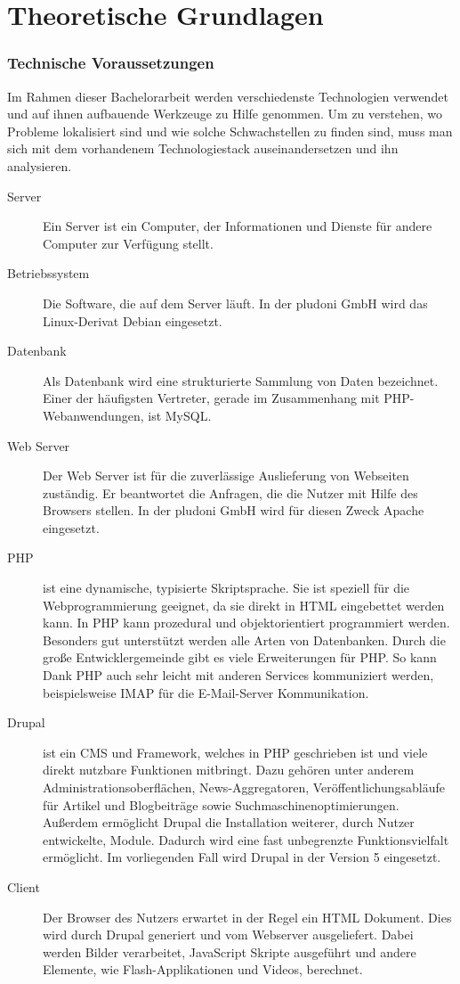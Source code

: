 \part{Theoretische Grundlagen}
\label{sec:theory}

\section{Technische Voraussetzungen}
Im Rahmen dieser Bachelorarbeit werden verschiedenste Technologien verwendet und auf ihnen aufbauende Werkzeuge zu Hilfe genommen. Um zu verstehen, wo Probleme lokalisiert sind und wie solche Schwachstellen zu finden sind, muss man sich mit dem vorhandenem Technologiestack auseinandersetzen und ihn analysieren.
\begin{description}
  \item[Server] Ein Server ist ein Computer, der Informationen und Dienste für andere Computer zur Verfügung stellt.
  \item[Betriebssystem] Die Software, die auf dem Server läuft. In der pludoni GmbH wird das Linux-Derivat Debian eingesetzt.
  \item[Datenbank] Als Datenbank wird eine strukturierte Sammlung von Daten bezeichnet. Einer der häufigsten Vertreter, gerade im Zusammenhang mit PHP-Webanwendungen, ist MySQL.
  \item[Web Server] Der Web Server ist für die zuverlässige Auslieferung von Webseiten zuständig. Er beantwortet die Anfragen, die die Nutzer mit Hilfe des Browsers stellen. In der pludoni GmbH wird f\"ur diesen Zweck Apache eingesetzt.
  \item[PHP] ist eine dynamische, typisierte Skriptsprache. Sie ist speziell f\"ur die Webprogrammierung geeignet, da sie direkt in HTML eingebettet werden kann.\citep{PHP2011} In PHP kann prozedural und objektorientiert programmiert werden. Besonders gut unterst\"utzt werden alle Arten von Datenbanken. Durch die gro\ss{}e Entwicklergemeinde gibt es viele Erweiterungen f\"ur PHP. So kann Dank PHP auch sehr leicht mit anderen Services kommuniziert werden, beispielsweise IMAP f\"ur die E-Mail-Server Kommunikation.\citep{PHP2011a}
  \item[Drupal] ist ein CMS und Framework, welches in PHP geschrieben ist und viele direkt nutzbare Funktionen mitbringt. Dazu gehören unter anderem Administrationsoberflächen, News-Aggregatoren, Veröffentlichungsabläufe für Artikel und Blogbeiträge sowie Suchmaschinenoptimierungen. Außerdem ermöglicht Drupal die Installation weiterer, durch Nutzer entwickelte, Module. Dadurch wird eine fast unbegrenzte Funktionsvielfalt ermöglicht. Im vorliegenden Fall wird Drupal in der Version 5 eingesetzt.
  \item[Client] Der Browser des Nutzers erwartet in der Regel ein HTML Dokument. Dies wird durch Drupal generiert und vom Webserver ausgeliefert. Dabei werden Bilder verarbeitet, JavaScript Skripte ausgeführt und andere Elemente, wie Flash-Applikationen und Videos, berechnet. 
\end{description}

